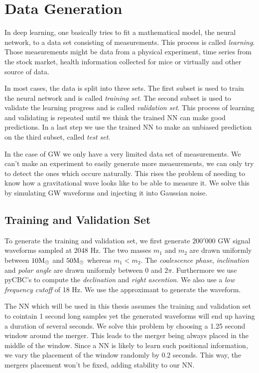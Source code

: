 
\section{Data Generation}
In deep learning, one basically tries to fit a mathematical model, the neural
network, to a data set consisting of measurements. This process is called
\textit{learning}.
Those measurements might be data from a physical experiment, time series from
the stock market, health information collected for mice or virtually and
other source of data.

In most cases, the data is split into three sets. The first subset is used to
train the neural network and is called \textit{training set}. The second subset 
is used to validate the learning progress and is called \textit{validation set}.
This process of learning and validating is repeated until we think the trained
NN can make good predictions. In a last step we use the trained NN to make an
unbiased prediction on the third subset, called \textit{test set}.

In the case of GW we only have a very limited data set of measurements. We can't
make an experiment to easily generate more measurements, we can only try to 
detect the ones which occure naturally. This rises the problem of needing to 
know how a gravitational wave looks like to be able to measure it. We solve this
by simulating GW waveforms and injecting it into Gaussian noise.

\subsection{Training and Validation Set}
To generate the training and validation set, we first generate $200'000$ GW signal
waveforms sampled at 2048 Hz. The two masses $m_1$ and $m_2$ are drawn uniformly
between $10 \textup{M}_\odot$
and $50 \textup{M}_\odot$ whereas $m_1 < m_2$. The \textit{coalescence phase},
\textit{inclination} and \textit{polar angle} are drawn uniformly between
$0$ and $2 \pi$. Furthermore we use
pyCBC's  to compute the \textit{declination} and
\textit{right ascention}. We also use a \textit{low frequency cutoff} of 18 Hz.
We use the  approximant to generate the waveform.

The NN which will be used in this thesis assumes the training and validation set
to cointain 1 second long samples yet the generated waveforms will end up having 
a duration of several seconds. We solve this problem by choosing a 1.25 second
window around the merger. This leads to the merger being always placed in
the middle of the window. Since a NN is likely to learn such positional
information, we vary the placement of the window randomly by 0.2
seconds. This way, the mergers placement won't be fixed, adding stability to our
NN.

